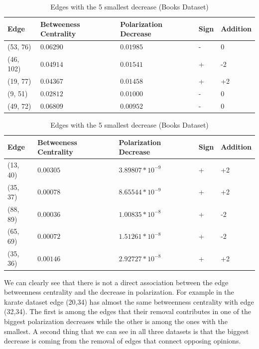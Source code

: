 \begin{table}[htbp]
 \centering
 \caption{Edges with the 5 largest decrease (Books Dataset)}
 \label{tab:edgesLargest}
 \begin{tabular}{| l || l | l | l | l |}
 \hline
  Edge & Betweeness Centrality & Polarization Decrease & Sign & Addition\\
  \hline
  \hline
  (53, 76) & $0.06290$ & $0.01985$ & - &  0\\
  \hline
  (46, 102) & $0.04914$ & $0.01541$ & + &  -2\\
  \hline
  (19, 77) & $0.04367$ & $0.01458$ & + &  +2\\
  \hline
  (9, 51) & $0.02812$ & $0.01000$ & - &  0\\
  \hline
  (49, 72) & $0.06809$ & $0.00952$ & - &  0\\
  \hline
 \end{tabular}
 
 
 \caption{Edges with the 5 smallest decrease (Books Dataset)}
 \label{tab:edgesLargest}
 \begin{tabular}{| l || l | l | l | l |}
 \hline
  Edge & Betweeness Centrality & Polarization Decrease & Sign & Addition\\
  \hline
  \hline
  (13, 40) & $0.00305$ & $3.89807*10^{-9}$ & + &  +2\\
  \hline
  (35, 37) & $0.00078$ & $8.65544*10^{-9}$ & + &  +2\\
  \hline
  (88, 89) & $0.00036$ & $1.00835*10^{-8}$ & + &  -2\\
  \hline
  (65, 69) & $0.00072$ & $1.51261*10^{-8}$ & + &  -2\\
  \hline
  (35, 36) & $0.00146$ & $2.92727*10^{-8}$ & + &  +2\\
  \hline
  \hline
 \end{tabular}
 
\end{table}


We can clearly see that there is not a direct association between the edge betweenness centrality and the decrease in polarization. For example in the karate dataset edge (20,34) has almost the same betweenness centrality with edge (32,34). The first is among the edges that their removal contributes in one of the biggest polarization decreases while the other is among the ones with the smallest. A second thing that we can see in all three datasets is that the biggest decrease is coming from the removal of edges that connect opposing opinions.
